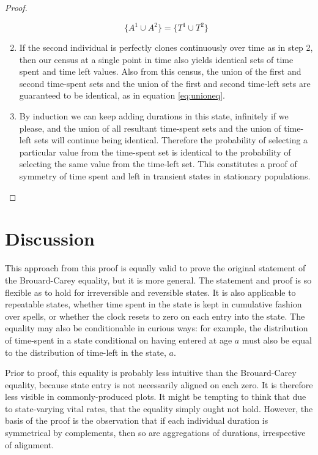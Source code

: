 \documentclass[12pt,oneside,a4paper]{article} %
\theoremstyle{definition}
\begin{document}
\begin{proof}
\begin{enumerate}
\begin{equation}
\label{eq:unioneq}
\{A^1 \cup A^2\} = \{T^1 \cup T^2\}
\end{equation}

\item{} If the second individual is perfectly clones continuously over time as
in step 2, then our census at a single point in time also yields
identical sets of time spent and time left values. Also from this census, the union of the
first and second time-spent sets and the union of the first and second time-left sets
are guaranteed to be identical, as in equation \eqref{eq:unioneq}. 

\item{} By induction we can keep adding durations in this state, infinitely if we
please, and the union of all resultant time-spent sets and the union of time-left sets will continue being identical. Therefore the
probability of selecting a particular value from the time-spent set is identical
to the probability of selecting the same value from the time-left set. This
constitutes a proof of symmetry of time spent and left in transient states in
stationary populations.
\end{enumerate}
\end{proof}

\section{Discussion}
This approach from this proof is equally valid to prove the
original statement of the Brouard-Carey equality, but it is more general. The
statement and proof is so flexible as to hold for irreversible and reversible
states. It is also applicable to repeatable states, whether time spent in the
state is kept in cumulative fashion over spells, or whether the clock resets to
zero on each entry into the state. The equality may also be conditionable in
curious ways: for example, the distribution of time-spent in a state conditional
on having entered at age $a$ must also be equal to the distribution of time-left in
the state, $a$. 

Prior to proof, this equality is probably less intuitive than the Brouard-Carey
equality, because state entry is not necessarily aligned on each zero. It is
therefore less visible in commonly-produced plots. It might be tempting to think
that due to state-varying vital rates, that the equality simply ought not hold.
However, the basis of the proof is the observation that if each individual
duration is symmetrical by complements, then so are aggregations of
durations, irrespective of alignment. 
\end{document}
